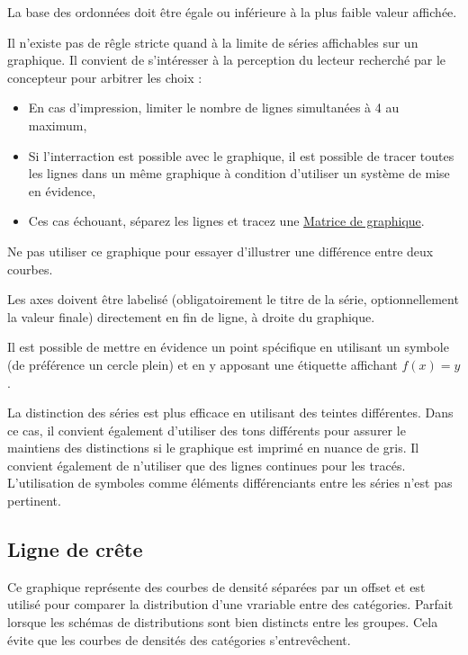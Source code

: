 \documentclass[a4paper,12pt]{article}
\begin{document}
\begin{multicols}{2}
La base des ordonnées doit être égale ou inférieure à la plus faible valeur affichée. \autocite{wongWallStreetJournal2010}

Il n'existe pas de rêgle stricte quand à la limite de séries affichables sur un graphique.\autocite{jonathanschwabishTime2021} Il convient de s'intéresser à la perception du lecteur recherché par le concepteur pour arbitrer les choix : \autocite{jonathanschwabishTime2021}
\begin{itemize}
\item En cas d'impression, limiter le nombre de lignes simultanées à 4 au maximum, \autocite{wongWallStreetJournal2010}
\item Si l'interraction est possible avec le graphique, il est possible de tracer toutes les lignes dans un même graphique à condition d'utiliser un système de mise en évidence,\autocite{jonathanschwabishTime2021}
\item Ces cas échouant, séparez les lignes et tracez une \hyperref[sec:org520b4af]{Matrice de graphique}.
\end{itemize}

Ne pas utiliser ce graphique pour essayer d'illustrer une différence entre deux courbes. \autocite{jonathanschwabishTime2021}

Les axes doivent être labelisé (obligatoirement le titre de la série, optionnellement la valeur finale) directement en fin de ligne, à droite du graphique. \autocite{andreaskrauseBestPracticesData2024,sosulskiGraphics2019}

Il est possible de mettre en évidence un point spécifique en utilisant un symbole (de préférence un cercle plein) et en y apposant une étiquette affichant \(f(x)=y\).

La distinction des séries est plus efficace en utilisant des teintes différentes. Dans ce cas, il convient également d'utiliser des tons différents pour assurer le maintiens des distinctions si le graphique est imprimé en nuance de gris. \autocite{stephenfewComponentlevelGraphDesign2012}
Il convient également de n'utiliser que des lignes continues pour les tracés. \autocite{stephenfewComponentlevelGraphDesign2012}
L'utilisation de symboles comme éléments différenciants entre les séries n'est pas pertinent. \autocite{stephenfewComponentlevelGraphDesign2012}
\subsection*{Ligne de crête}
\label{sec:orgccf4d09}
Ce graphique représente des courbes de densité séparées par un offset et est utilisé pour comparer la distribution d'une vrariable entre des catégories. \autocite{wilkeVisualizingManyDistributions2019} Parfait lorsque les schémas de distributions sont bien distincts entre les groupes. \autocite{mikeyiHowChooseRight2020} Cela évite que les courbes de densités des catégories s'entrevêchent.\autocite{jonathanschwabishDistribution2021}


\end{multicols}
\end{document}
